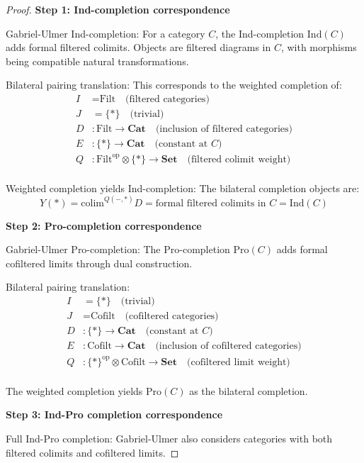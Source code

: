\documentclass[11pt]{article}
\theoremstyle{plain}
\theoremstyle{definition}
\theoremstyle{remark}
\newcommand{\op}{\mathrm{op}}
\newcommand{\colim}{\mathrm{colim}}
\begin{document}
\begin{proof}
\textbf{Step 1: Ind-completion correspondence}

Gabriel-Ulmer Ind-completion: For a category $C$, the Ind-completion $\text{Ind}(C)$ adds formal filtered colimits. Objects are filtered diagrams in $C$, with morphisms being compatible natural transformations.

Bilateral pairing translation: This corresponds to the weighted completion of:
\begin{align}
I &= \text{Filt} \quad \text{(filtered categories)} \\
J &= \{*\} \quad \text{(trivial)} \\
D &: \text{Filt} \to \mathbf{Cat} \quad \text{(inclusion of filtered categories)} \\
E &: \{*\} \to \mathbf{Cat} \quad \text{(constant at } C \text{)} \\
Q &: \text{Filt}^{\op} \otimes \{*\} \to \mathbf{Set} \quad \text{(filtered colimit weight)} \\
\end{align}

Weighted completion yields Ind-completion: The bilateral completion objects are:
$$Y(*) = \colim^{Q(-, *)} D = \text{formal filtered colimits in } C = \text{Ind}(C)$$

\textbf{Step 2: Pro-completion correspondence}

Gabriel-Ulmer Pro-completion: The Pro-completion $\text{Pro}(C)$ adds formal cofiltered limits through dual construction.

Bilateral pairing translation:
\begin{align}
I &= \{*\} \quad \text{(trivial)} \\
J &= \text{Cofilt} \quad \text{(cofiltered categories)} \\
D &: \{*\} \to \mathbf{Cat} \quad \text{(constant at } C \text{)} \\
E &: \text{Cofilt} \to \mathbf{Cat} \quad \text{(inclusion of cofiltered categories)} \\
Q &: \{*\}^{\op} \otimes \text{Cofilt} \to \mathbf{Set} \quad \text{(cofiltered limit weight)} \\
\end{align}

The weighted completion yields $\text{Pro}(C)$ as the bilateral completion.

\textbf{Step 3: Ind-Pro completion correspondence}

Full Ind-Pro completion: Gabriel-Ulmer also considers categories with both filtered colimits and cofiltered limits.


\end{proof}
\end{document}
